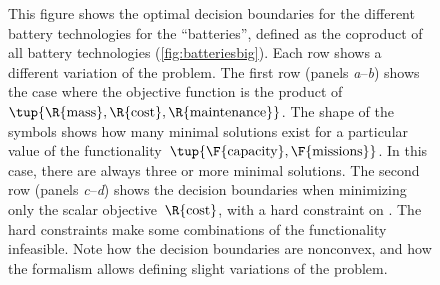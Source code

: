 \begin{figure}
\begin{centering}
    \end{centering}
    \caption{This figure shows the optimal decision boundaries for the different battery technologies for the  ``batteries'', defined as the coproduct of all battery technologies (\cref{fig:batteriesbig}).
        Each row shows a different variation of the problem.
        The first row (panels \emph{a}--\emph{b}) shows the case where the objective function is the product of~$\tup{\R{\text{mass}},\R{\text{cost}},\R{\text{maintenance}}} $.
        The shape of the symbols shows how many minimal solutions exist for a particular value of the functionality~$\tup{\F{\text{capacity}},\F{\text{missions}}}$.
        In this case, there are always three or more minimal solutions.
        The second row (panels \emph{c}--\emph{d}) shows the decision boundaries when minimizing only the scalar objective~$\R{\text{cost}}$, with a hard constraint on .
        The hard constraints make some combinations of the functionality infeasible.
        Note how the decision boundaries are nonconvex, and how the formalism allows defining slight variations of the problem.
    }
    \label{fig:mainbattery}
\end{figure}
